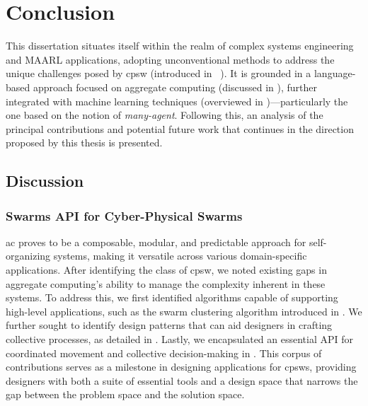 \chapter{Conclusion}\label{chap:wrap-up}%
This dissertation situates itself within the realm of complex systems engineering and \acf{MAARL} applications, 
 adopting unconventional methods to address the unique challenges posed by \acf{cpsw} (introduced in ~). 
 It is grounded in a language-based approach focused on aggregate computing (discussed in ), 
 further integrated with machine learning techniques (overviewed in )---particularly the one based on the notion of \emph{many-agent}. 
 Following this, 
 an analysis of the principal contributions 
 and potential future work that continues in the direction proposed by this thesis is presented.
\section{Discussion}
\subsection*{Swarms API for Cyber-Physical Swarms}
\ac{ac} proves to be a composable, 
 modular, and predictable approach for self-organizing systems, 
 making it versatile across various domain-specific applications.
% 
After identifying the class of \ac{cpsw}, 
 we noted existing gaps in aggregate computing's ability to manage the complexity inherent in these systems. 
 To address this, we first identified algorithms capable of supporting high-level applications, 
 such as the swarm clustering algorithm introduced in . 
% 
We further sought to identify design patterns that can aid designers in crafting collective processes, 
 as detailed in . 
 Lastly, we encapsulated an essential API for coordinated movement and collective decision-making in . 
%
This corpus of contributions serves as a milestone in designing applications for \acp{cpsw}, 
 providing designers with both a suite of essential tools and a design space that narrows the gap between the problem space and the solution space.
